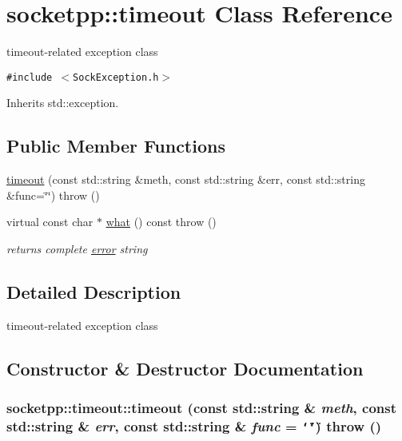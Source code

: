 \hypertarget{classsocketpp_1_1timeout}{
\section{socketpp::timeout Class Reference}
\label{classsocketpp_1_1timeout}
}
timeout-related exception class  


{\tt \#include $<$SockException.h$>$}

Inherits std::exception.

\subsection*{Public Member Functions}
\begin{CompactItemize}
\item 
\hyperlink{classsocketpp_1_1timeout_e93bd15dc9a3209c582782770b909049}{timeout} (const std::string \&meth, const std::string \&err, const std::string \&func=\char`\"{}\char`\"{})  throw ()
\item 
\hypertarget{classsocketpp_1_1timeout_4ec44590b052339b206a94afbcba6ffb}{
virtual const char $\ast$ \hyperlink{classsocketpp_1_1timeout_4ec44590b052339b206a94afbcba6ffb}{what} () const   throw ()}
\label{classsocketpp_1_1timeout_4ec44590b052339b206a94afbcba6ffb}

\begin{CompactList}\small\item\em returns complete \hyperlink{classsocketpp_1_1error}{error} string \item\end{CompactList}\end{CompactItemize}


\subsection{Detailed Description}
timeout-related exception class 

\subsection{Constructor \& Destructor Documentation}
\hypertarget{classsocketpp_1_1timeout_e93bd15dc9a3209c582782770b909049}{
\subsubsection[{timeout}]{\setlength{\rightskip}{0pt plus 5cm}socketpp::timeout::timeout (const std::string \& {\em meth}, \/  const std::string \& {\em err}, \/  const std::string \& {\em func} = {\tt \char`\"{}\char`\"{}})  throw ()}}
\label{classsocketpp_1_1timeout_e93bd15dc9a3209c582782770b909049}


